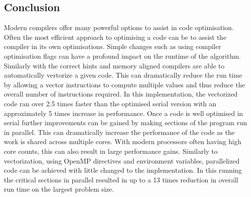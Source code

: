 \documentclass{article}
\begin{document}
\begin{multicols}{2}
\section{Conclusion}

Modern compilers offer many powerful options to assist in code optimisation.
Often the most efficient approach to optimising a code can be to assist the
compiler in its own optimisations. Simple changes such as using compiler
optimisation flags can have a profound impact on the runtime of the algorithm.
Similarly with the correct hints and memory aligned compilers are able to
automatically vertorize a given code. This can dramatically reduce the run time
by allowing a vector instructions to compute multiple values and thus reduce the
overall number of instructions required. In this implementation, the vectorized code ran
over 2.5 times faster than the optimised serial version with an approximately 5
times increase in performance. Once a code is well optimised in serial further
improvements can be gained by making sections of the program run in parallel.
This can dramatically increase the performance of the code as the work is
shared across multiple cores. With modern processors often having high core
counts, this can also result in large performance gains.  Similarly to
vectorization, using OpenMP directives and environment variables, parallelized
code can be achieved with little changed to the implementation. In this running
the critical sections in parallel resulted in up to a 13 times reduction in
overall run time on the largest problem size.





\end{multicols}
\end{document}
